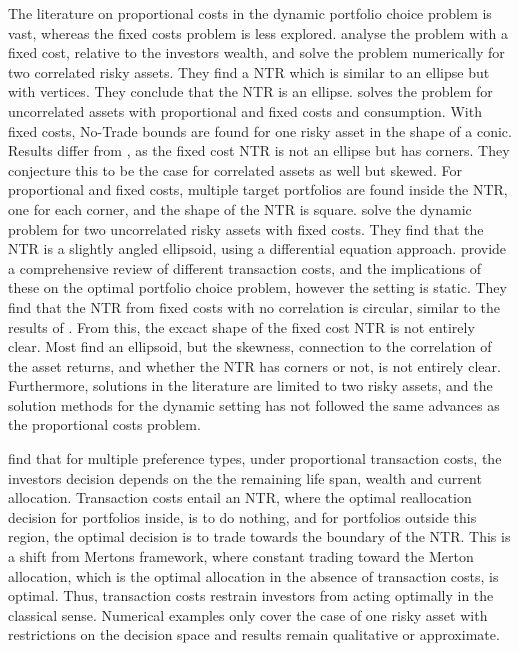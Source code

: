 \documentclass[11pt]{article}
\begin{document}
The literature on proportional costs in the dynamic portfolio choice problem is vast, whereas the fixed costs problem is less explored.
\autocite{morton1995optimal} analyse the problem with a fixed cost, relative to the investors wealth, and solve the problem numerically for two correlated risky assets.
They find a \ac{NTR} which is similar to an ellipse but with vertices. They conclude that the NTR is an ellipse.
\autocite{liu2002} solves the problem for uncorrelated assets with proportional and fixed costs and consumption. With fixed costs, No-Trade bounds are found for one risky asset in the shape of a conic.
Results differ from \autocite{morton1995optimal}, as the fixed cost NTR is not an ellipse but has corners. They conjecture this to be the case for correlated assets as well but skewed.
For proportional and fixed costs, multiple target portfolios are found inside the NTR, one for each corner, and the shape of the NTR is square.
\autocite{altarovici2015asymptotics} solve the dynamic problem for two uncorrelated risky assets with fixed costs.
They find that the \ac{NTR} is a slightly angled ellipsoid, using a differential equation approach.
\autocite{Dybvig2020} provide a comprehensive review of different transaction costs, and the implications of these on the optimal portfolio choice problem, however the setting is static.
They find that the \ac{NTR} from fixed costs with no correlation is circular, similar to the results of \autocite{morton1995optimal}.
From this, the excact shape of the fixed cost \ac{NTR} is not entirely clear. Most find an ellipsoid, but the skewness, connection to the correlation of the asset returns,
and whether the NTR has corners or not, is not entirely clear.
Furthermore, solutions in the literature are limited to two risky assets,
and the solution methods for the dynamic setting has not followed the same advances as the proportional costs problem.

\autocites{Zabel1973}{Constantinides1976}{Constantinides1986} find that for multiple preference types,
under proportional transaction costs, the investors decision depends on the the remaining life span, wealth and current allocation.
Transaction costs entail an \ac{NTR}, where the optimal reallocation decision for portfolios inside, is to do nothing, and for portfolios outside this region,
the optimal decision is to trade towards the boundary of the \ac{NTR}. This is a shift from Mertons framework, where constant trading toward the Merton allocation,
which is the optimal allocation in the absence of transaction costs, is optimal. Thus, transaction costs restrain
investors from acting optimally in the classical sense.
Numerical examples only cover the case of one risky asset with restrictions on the decision space and results remain qualitative or approximate.
\end{document}
